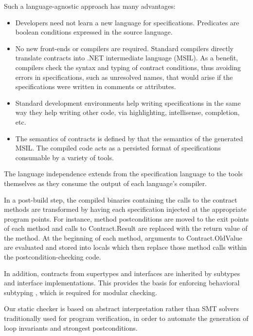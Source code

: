 \documentclass[10pt,twocolumn]{article}
\begin{document}
Such a language-agnostic approach has many advantages: 
\begin{itemize}
\item Developers need not learn a new language for
specifications. Predicates are boolean conditions expressed in the
source language.
\item No new front-ends or compilers are required. Standard compilers directly translate contracts into
  .NET intermediate language (MSIL). As a benefit, compilers
  check the syntax and typing of contract conditions, thus avoiding errors in specifications,
  such as unresolved names, that would arise if the specifications
  were written in comments or attributes.
\item Standard development environments help writing
  specifications in the same way they help writing other code, via highlighting, intellisense,
  completion, etc.
\item The semantics of contracts is defined by that the semantics of the generated MSIL. 
  The compiled code acts as a persisted format of specifications consumable by a variety of tools.
\end{itemize}
The language independence extends from the specification language to
the tools themselves as they consume the output of each language's compiler.

In a post-build step, the compiled binaries containing the calls to the contract
methods are transformed by having each specification injected at the 
appropriate program points.
For instance, method postconditions are moved to the exit points of each method
and calls to Contract.Result are replaced with the return value of the method.
At the beginning of each method, arguments to Contract.OldValue are evaluated and
stored into locals which then replace those method calls within the postcondition-checking
code.

In addition, contracts from supertypes and interfaces are inherited by subtypes
and interface implementations. This provides the basis for enforcing behavioral
subtyping \cite{Liskov-Wing94}, which is required for modular checking.

Our static checker is based on abstract interpretation rather than
SMT solvers traditionally used for program verification, in order to
automate the generation of loop
invariants and strongest postconditions.
\end{document}
